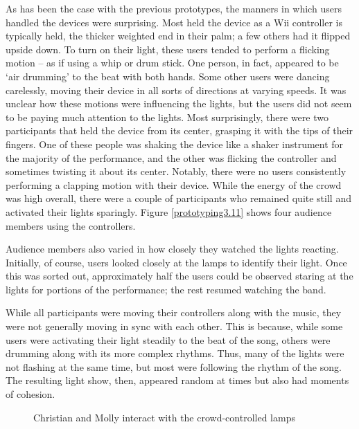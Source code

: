 As has been the case with the previous prototypes, the manners in which users handled the devices were surprising. Most held the device as a Wii controller is typically held, the thicker weighted end in their palm; a few others had it flipped upside down. To turn on their light, these users tended to perform a flicking motion -- as if using a whip or drum stick. One person, in fact, appeared to be `air drumming' to the beat with both hands. Some other users were dancing carelessly, moving their device in all sorts of directions at varying speeds. It was unclear how these motions were influencing the lights, but the users did not seem to be paying much attention to the lights. Most surprisingly, there were two participants that held the device from its center, grasping it with the tips of their fingers. One of these people was shaking the device like a shaker instrument for the majority of the performance, and the other was flicking the controller and sometimes twisting it about its center. Notably, there were no users consistently performing a clapping motion with their device. While the energy of the crowd was high overall, there were a couple of participants who remained quite still and activated their lights sparingly. Figure \ref{prototyping3.11} shows four audience members using the controllers.

Audience members also varied in how closely they watched the lights reacting. Initially, of course, users looked closely at the lamps to identify their light. Once this was sorted out, approximately half the users could be observed staring at the lights for portions of the performance; the rest resumed watching the band.

While all participants were moving their controllers along with the music, they were not generally moving in sync with each other. This is because, while some users were activating their light steadily to the beat of the song, others were drumming along with its more complex rhythms. Thus, many of the lights were not flashing at the same time, but most were following the rhythm of the song. The resulting light show, then, appeared random at times but also had moments of cohesion.

\begin{figure}
	\centering

	\hspace{0.1cm}

	\caption{Christian and Molly interact with the crowd-controlled lamps}

	\label{prototyping3.12}
\end{figure}

